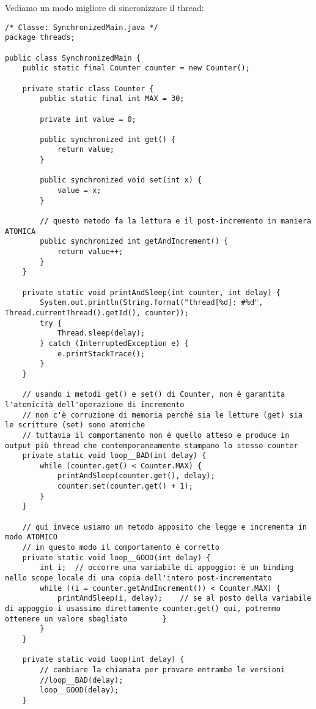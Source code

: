 \noindent Vediamo un modo migliore di sincronizzare il thread:

\begin{lstlisting}[basicstyle=\small,]
/* Classe: SynchronizedMain.java */
package threads;

public class SynchronizedMain {
    public static final Counter counter = new Counter();

    private static class Counter {
        public static final int MAX = 30;

        private int value = 0;

        public synchronized int get() {
            return value;
        }

        public synchronized void set(int x) {
            value = x;
        }

        // questo metodo fa la lettura e il post-incremento in maniera ATOMICA
        public synchronized int getAndIncrement() {
            return value++;
        }
    }

    private static void printAndSleep(int counter, int delay) {
        System.out.println(String.format("thread[%d]: #%d", Thread.currentThread().getId(), counter));
        try {
            Thread.sleep(delay);
        } catch (InterruptedException e) {
            e.printStackTrace();
        }
    }

    // usando i metodi get() e set() di Counter, non è garantita l'atomicità dell'operazione di incremento
    // non c'è corruzione di memoria perché sia le letture (get) sia le scritture (set) sono atomiche
    // tuttavia il comportamento non è quello atteso e produce in output più thread che contemporaneamente stampano lo stesso counter
    private static void loop__BAD(int delay) {
        while (counter.get() < Counter.MAX) {
            printAndSleep(counter.get(), delay);
            counter.set(counter.get() + 1);
        }
    }

    // qui invece usiamo un metodo apposito che legge e incrementa in modo ATOMICO
    // in questo modo il comportamento è corretto
    private static void loop__GOOD(int delay) {
        int i;  // occorre una variabile di appoggio: è un binding nello scope locale di una copia dell'intero post-incrementato
        while ((i = counter.getAndIncrement()) < Counter.MAX) {
            printAndSleep(i, delay);    // se al posto della variabile di appoggio i usassimo direttamente counter.get() qui, potremmo ottenere un valore sbagliato        }
        }
    }

    private static void loop(int delay) {
        // cambiare la chiamata per provare entrambe le versioni
        //loop__BAD(delay);
        loop__GOOD(delay);
    }


\end{lstlisting}
